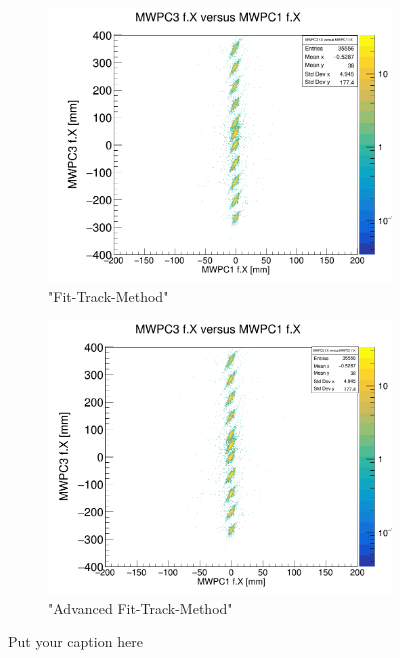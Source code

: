 \documentclass[12pt, letterpaper]{article}
\begin{document}
\begin{figure}[!htbp]
\begin{subfigure}{.5\textwidth}
\end{subfigure}
\begin{subfigure}{.5\textwidth}
  \centering
  \includegraphics[width=.9\linewidth]{plot_imgs/mw3_mw1_fit.png} 
  \caption{"Fit-Track-Method"}
  \label{fig:sub-second}
\end{subfigure}
\begin{subfigure}{.5\textwidth}
  \centering
  \includegraphics[width=.9\linewidth]{plot_imgs/mw3_mw1_last.png} 
  \caption{"Advanced Fit-Track-Method"}
  \label{fig:sub-second}
\end{subfigure}
\caption{Put your caption here}
\label{fig:fig}
\end{figure}
\FloatBarrier
\clearpage
\end{document}
